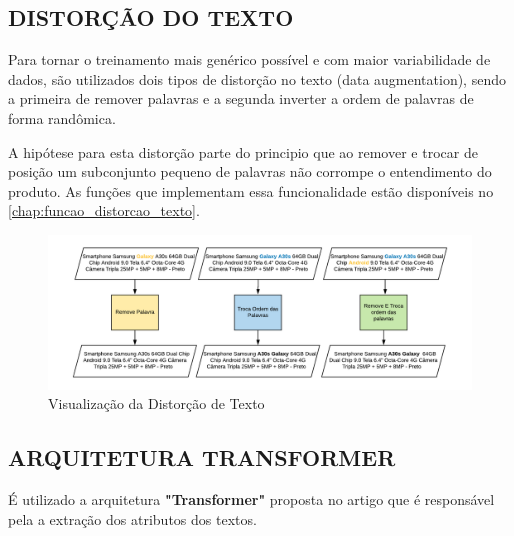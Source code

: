 \subsection{DISTORÇÃO DO TEXTO}
\label{distorcao_de_texto_chap}

Para tornar o treinamento mais genérico possível e com maior variabilidade de dados, são utilizados dois tipos de distorção no texto (data augmentation), sendo a primeira de remover palavras e a segunda inverter a ordem de palavras de forma randômica.

A hipótese para esta distorção parte do principio que ao remover e trocar de posição um subconjunto pequeno de palavras não corrompe o entendimento do produto. As funções que implementam essa funcionalidade estão disponíveis no \autoref{chap:funcao_distorcao_texto}.

\begin{figure}[]
	\caption{\label{distorcao_de_texto} Visualização da Distorção de Texto}
	\begin{center}
	    \includegraphics[width=\textwidth]{artigo/recursos/imagens/distorcao_de_texto.png}
	\end{center}
\end{figure}

\subsection{ARQUITETURA TRANSFORMER}

É utilizado a arquitetura \textbf{"Transformer"} proposta no artigo \cite{transformer} que é responsável pela a extração dos atributos dos textos.

